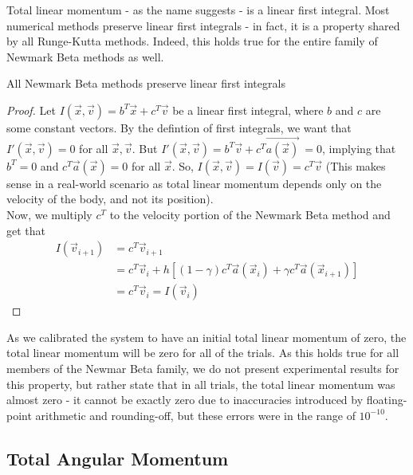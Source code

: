 \documentclass[../Main.tex]{subfiles}
\begin{document}
Total linear momentum - as the name suggests - is a linear first integral. Most numerical methods preserve linear first integrals - in fact, it is a property shared by all Runge-Kutta methods. Indeed, this holds true for the entire family of Newmark Beta methods as well.
\begin{claim} All Newmark Beta methods preserve linear first integrals \end{claim}
\begin{proof}
Let $I(\vec{x}, \vec{v}) = b^{T}\vec{x} + c^{T}\vec{v}$ be a linear first integral, where $b$ and $c$ are some constant vectors.
By the defintion of first integrals, we want that $I'(\vec{x}, \vec{v})= 0$ for all $\vec{x}, \vec{v}$.
But $I'(\vec{x}, \vec{v}) = b^{T}\vec{v} + c^{T}\vec{a(\vec{x})}\ = 0$, implying that $b^{T} = 0$ and $c^{T}\vec{a}(\vec{x}) = 0$ for all $\vec{x}$. So, $I(\vec{x}, \vec{v}) = I(\vec{v}) = c^{T}\vec{v}$ (This makes sense in a real-world scenario as total linear momentum depends only on the velocity of the body, and not its position).\\
Now, we multiply $c^{T}$ to the velocity portion of the Newmark Beta method and get that
\begin{align*}
I\left(\vec{v}_{i+1}\right) &= c^{T}\vec{v}_{i+1} \\
&= c^{T}\vec{v}_{i} + h\left[\left(1-\gamma\right)c^{T}\vec{a}(\vec{x}_{i}) + \gamma c^{T}\vec{a}(\vec{x}_{i+1})\right] \\
&= c^{T}\vec{v}_{i} = I\left(\vec{v}_{i}\right)
\end{align*} 
\end{proof}

As we calibrated the system to have an initial total linear momentum of zero, the total linear momentum will be zero for all of the trials. As this holds true for all members of the Newmar Beta family, we do not present experimental results for this property, but rather state that in all trials, the total linear momentum was almost zero - it cannot be exactly zero due to inaccuracies introduced by floating-point arithmetic and rounding-off, but these errors were in the range of $10^{-10}$.

\subsection{Total Angular Momentum}
\end{document}
